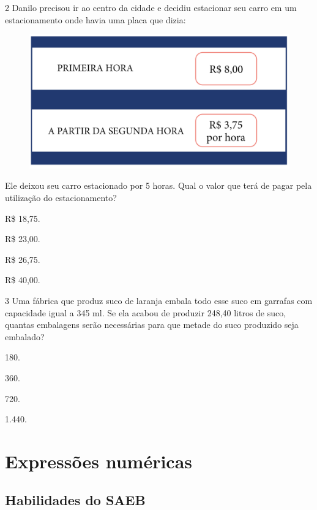 \num{2} Danilo precisou ir ao centro da cidade e decidiu estacionar seu
carro em um estacionamento onde havia uma placa que dizia:

\begin{figure}[htpb!]
\centering
\includegraphics[width=.5\textwidth]{../ilustracoes/MAT5/SAEB_5ANO_MAT_figura89.png}
\end{figure}

Ele deixou seu carro estacionado por 5 horas. Qual o valor que terá de pagar pela utilização do estacionamento?

\begin{minipage}{.5\textwidth}
\begin{escolha}
\item
  R\$ 18,75.
\item
  R\$ 23,00.
\item
  R\$ 26,75.
\item
  R\$ 40,00.
\end{escolha}
\end{minipage}


\num{3} Uma fábrica que produz suco de laranja embala todo esse suco em
garrafas com capacidade igual a 345 ml. Se ela acabou de produzir 248,40
litros de suco, quantas embalagens serão necessárias para que metade do
suco produzido seja embalado?

\begin{minipage}{.5\textwidth}
\begin{escolha}
\item
  180.
\item
  360.
\item
  720.
\item
  1.440.
\end{escolha}
\end{minipage}


\chapter{Expressões numéricas}

\section*{Habilidades do SAEB}

